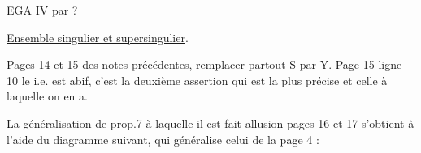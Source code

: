   

EGA IV par ?

\uline{Ensemble singulier et supersingulier}.

Pages 14 et 15 des notes précédentes, remplacer partout S par Y. Page
15 ligne 10 le i.e. est abif, c'est la deuxième assertion qui est la
plus précise et celle à laquelle on en a.

La généralisation de prop.7 à laquelle il est fait allusion pages 16
et 17 s'obtient à l'aide du diagramme suivant, qui généralise celui de la
page 4 :

